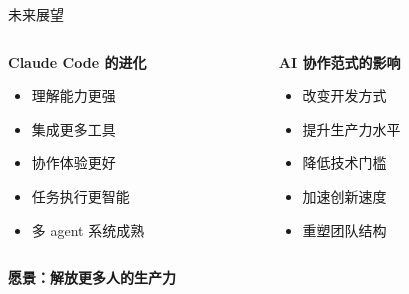 \documentclass[aspectratio=169,xcolor=dvipsnames]{beamer}
\begin{document}
\begin{frame}{未来展望}
  \begin{columns}
    \begin{column}{0.48\textwidth}
      \textbf{Claude Code 的进化}
      \begin{itemize}
        \item 理解能力更强
        \item 集成更多工具
        \item 协作体验更好
        \item 任务执行更智能
        \item 多 agent 系统成熟
      \end{itemize}
    \end{column}
    \begin{column}{0.48\textwidth}
      \textbf{AI 协作范式的影响}
      \begin{itemize}
        \item 改变开发方式
        \item 提升生产力水平
        \item 降低技术门槛
        \item 加速创新速度
        \item 重塑团队结构
      \end{itemize}
    \end{column}
  \end{columns}

  \vspace{0.5cm}

  \begin{center}
    \large
    \textbf{愿景：解放更多人的生产力}
  \end{center}
\end{frame}
\end{document}

